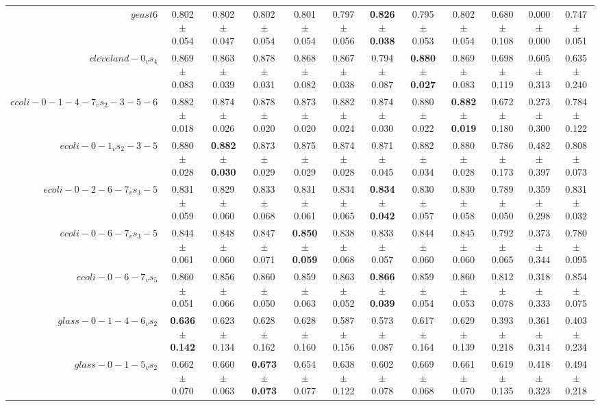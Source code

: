 \begin{table}[!ht]
{\begin{tabular}{r c c c c c c c c c c c}
$yeast6$ & 0.802 $\pm$ 0.054 & 0.802 $\pm$ 0.047 & 0.802 $\pm$ 0.054 & 0.801 $\pm$ 0.054 & 0.797 $\pm$ 0.056 & \textbf{0.826 $\pm$ 0.038} & 0.795 $\pm$ 0.053 & 0.802 $\pm$ 0.054 & 0.680 $\pm$ 0.108 & 0.000 $\pm$ 0.000 & 0.747 $\pm$ 0.051 \\
$cleveland-0_vs_4$ & 0.869 $\pm$ 0.083 & 0.863 $\pm$ 0.039 & 0.878 $\pm$ 0.031 & 0.868 $\pm$ 0.082 & 0.867 $\pm$ 0.038 & 0.794 $\pm$ 0.087 & \textbf{0.880 $\pm$ 0.027} & 0.869 $\pm$ 0.083 & 0.698 $\pm$ 0.119 & 0.605 $\pm$ 0.313 & 0.635 $\pm$ 0.240 \\
$ecoli-0-1-4-7_vs_2-3-5-6$ & 0.882 $\pm$ 0.018 & 0.874 $\pm$ 0.026 & 0.878 $\pm$ 0.020 & 0.873 $\pm$ 0.020 & 0.882 $\pm$ 0.024 & 0.874 $\pm$ 0.030 & 0.880 $\pm$ 0.022 & \textbf{0.882 $\pm$ 0.019} & 0.672 $\pm$ 0.180 & 0.273 $\pm$ 0.300 & 0.784 $\pm$ 0.122 \\
$ecoli-0-1_vs_2-3-5$ & 0.880 $\pm$ 0.028 & \textbf{0.882 $\pm$ 0.030} & 0.873 $\pm$ 0.029 & 0.875 $\pm$ 0.029 & 0.874 $\pm$ 0.028 & 0.871 $\pm$ 0.045 & 0.882 $\pm$ 0.034 & 0.880 $\pm$ 0.028 & 0.786 $\pm$ 0.173 & 0.482 $\pm$ 0.397 & 0.808 $\pm$ 0.073 \\
$ecoli-0-2-6-7_vs_3-5$ & 0.831 $\pm$ 0.059 & 0.829 $\pm$ 0.060 & 0.833 $\pm$ 0.068 & 0.831 $\pm$ 0.061 & 0.834 $\pm$ 0.065 & \textbf{0.834 $\pm$ 0.042} & 0.830 $\pm$ 0.057 & 0.830 $\pm$ 0.058 & 0.789 $\pm$ 0.050 & 0.359 $\pm$ 0.298 & 0.831 $\pm$ 0.032 \\
$ecoli-0-6-7_vs_3-5$ & 0.844 $\pm$ 0.061 & 0.848 $\pm$ 0.060 & 0.847 $\pm$ 0.071 & \textbf{0.850 $\pm$ 0.059} & 0.838 $\pm$ 0.068 & 0.833 $\pm$ 0.057 & 0.844 $\pm$ 0.060 & 0.845 $\pm$ 0.060 & 0.792 $\pm$ 0.065 & 0.373 $\pm$ 0.344 & 0.780 $\pm$ 0.095 \\
$ecoli-0-6-7_vs_5$ & 0.860 $\pm$ 0.051 & 0.856 $\pm$ 0.066 & 0.860 $\pm$ 0.050 & 0.859 $\pm$ 0.063 & 0.863 $\pm$ 0.052 & \textbf{0.866 $\pm$ 0.039} & 0.859 $\pm$ 0.054 & 0.860 $\pm$ 0.053 & 0.812 $\pm$ 0.078 & 0.318 $\pm$ 0.333 & 0.854 $\pm$ 0.075 \\
$glass-0-1-4-6_vs_2$ & \textbf{0.636 $\pm$ 0.142} & 0.623 $\pm$ 0.134 & 0.628 $\pm$ 0.162 & 0.628 $\pm$ 0.160 & 0.587 $\pm$ 0.156 & 0.573 $\pm$ 0.087 & 0.617 $\pm$ 0.164 & 0.629 $\pm$ 0.139 & 0.393 $\pm$ 0.218 & 0.361 $\pm$ 0.314 & 0.403 $\pm$ 0.234 \\
$glass-0-1-5_vs_2$ & 0.662 $\pm$ 0.070 & 0.660 $\pm$ 0.063 & \textbf{0.673 $\pm$ 0.073} & 0.654 $\pm$ 0.077 & 0.638 $\pm$ 0.122 & 0.602 $\pm$ 0.078 & 0.669 $\pm$ 0.068 & 0.661 $\pm$ 0.070 & 0.619 $\pm$ 0.135 & 0.418 $\pm$ 0.323 & 0.494 $\pm$ 0.218 \\

\end{tabular}}
\end{table}
